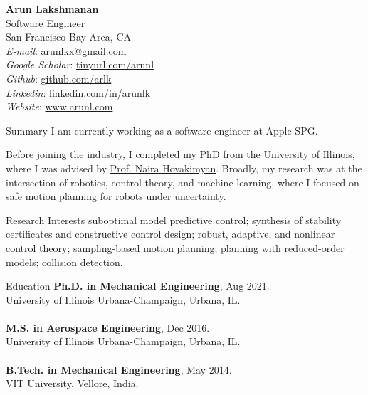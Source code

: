 \documentclass[9pt]{article}
\begin{document}
\begin{rsection}{}
\textbf{\large Arun Lakshmanan} \\
Software Engineer \\
San Francisco Bay Area, CA 
\vspace{0.5em} \\
\textit{E-mail}: \href{mailto:arunlkx@gmail.com}{arunlkx@gmail.com} \\
\textit{Google Scholar}: \href{https://tinyurl.com/arunl}{tinyurl.com/arunl} \\
\textit{Github}: \href{https://github.com/arlk}{github.com/arlk} \\
\textit{Linkedin}: \href{https://www.linkedin.com/in/arunlk/}{linkedin.com/in/arunlk} \\
\textit{Website}: \href{https://www.arunl.com}{www.arunl.com} 
\end{rsection}

\begin{rsection}{Summary}
I am currently working as a software engineer at Apple SPG. 

Before joining the industry, I completed my PhD from the University of Illinois, where I was advised by \href{https://naira-hovakimyan.mechse.illinois.edu/}{Prof. Naira Hovakimyan}. Broadly, my research was at the intersection of robotics, control theory, and machine learning, where I focused on safe motion planning for robots under uncertainty. 
\end{rsection}

\begin{rsection}{Research Interests}
suboptimal model predictive control; synthesis of stability certificates and constructive control design; robust, adaptive, and nonlinear control theory; sampling-based motion planning; planning with reduced-order models; collision detection.
\end{rsection}

\begin{rsection}{Education}
    \textbf{Ph.D. in Mechanical Engineering}, Aug 2021. \\
    University of Illinois Urbana-Champaign, Urbana, IL. \\ \\
    \textbf{M.S. in Aerospace Engineering}, Dec 2016. \\
    University of Illinois Urbana-Champaign, Urbana, IL. \\ \\
    \textbf{B.Tech. in Mechanical Engineering}, May 2014. \\
    VIT University, Vellore, India.
\end{rsection}
\end{document}
